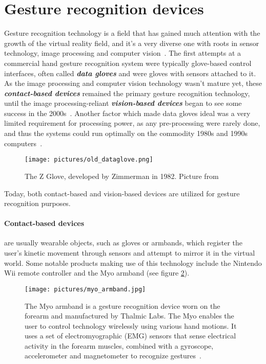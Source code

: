 \section{Gesture recognition devices}
Gesture recognition technology is a field that has gained much attention with the growth of the virtual reality field, 
and it's a very diverse one with roots in sensor technology, image processing and computer vision~\citep{Vafadar2014}. 
The first attempts at a commercial hand gesture recognition system were typically glove-based control interfaces, often called \textbf{\textit{data gloves}} 
and were gloves with sensors attached to it. As the image processing and computer vision technology wasn't mature yet, these \textbf{\textit{contact-based devices}} remained 
the primary gesture recognition technology, until the image processing-reliant \textbf{\textit{vision-based devices}} began to see some success in the 2000s~\citep{Premaratne2014}.
Another factor which made data gloves ideal was a very limited requirement for processing power, as any pre-processing were rarely done, 
and thus the systems could run optimally on the commodity 1980s and 1990s computers~\citep{Premaratne2014}.  

\begin{figure}%
	\texttt{[image: pictures/old\_dataglove.png]}
	\caption[The Z Glove]{The Z Glove, developed by Zimmerman in 1982. Picture from \citet{Premaratne2014}}
	\label{fig:old_dataglove}
\end{figure} 

Today, both contact-based and vision-based devices are utilized for gesture recognition purposes. 

\paragraph{Contact-based devices} are usually wearable objects, such as gloves or armbands, 
which register the user's kinetic movement through sensors and attempt to mirror it in the virtual world. 
Some notable products making use of this technology include the Nintendo Wii remote controller and the Myo armband (see figure \ref{fig:myo}). 

\begin{figure}%
	\texttt{[image: pictures/myo\_armband.jpg]}
	\caption[The Myo armband]{The Myo armband is a gesture recognition device worn on the forearm and manufactured by Thalmic Labs. 
	The Myo enables the user to control technology wirelessly using various hand motions. 
	It uses a set of electromyographic (EMG) sensors that sense electrical activity in the forearm muscles, combined with a gyroscope, 
	accelerometer and magnetometer to recognize gestures~\citep{Myo2015}.}
	\label{fig:myo}
\end{figure}


